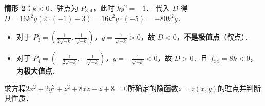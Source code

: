 \documentclass[12pt, a4paper, oneside, UTF8]{ctexbook}
\begin{document}
\begin{solution}
    \textbf{情形 2：$k < 0$}．驻点为 $P_{3,4}$，此时 $ky^2 = -1$．
    代入 $D$ 得 $D = 16k^2y(2 \cdot (-1) - 3) = 16k^2y \cdot (-5) = -80k^2y$．
    \begin{itemize}
        \item 对于 $P_3 = \left( \frac{1}{2\sqrt{-k}}, \frac{1}{\sqrt{-k}} \right)$，$y = \frac{1}{\sqrt{-k}} > 0$，故 $D < 0$，\textbf{不是极值点}（鞍点）．
        \item 对于 $P_4 = \left( -\frac{1}{2\sqrt{-k}}, -\frac{1}{\sqrt{-k}} \right)$，$y = -\frac{1}{\sqrt{-k}} < 0$，故 $D > 0$．且 $f_{xx} = 8k < 0$，为\textbf{极大值点}．
    \end{itemize}
\end{solution}
\begin{exercise}
    求方程$2x^2+2y^2+z^2+8xz-z+8=0$所确定的隐函数$z=z(x,y)$的驻点并判断其性质．
\end{exercise}
\end{document}
